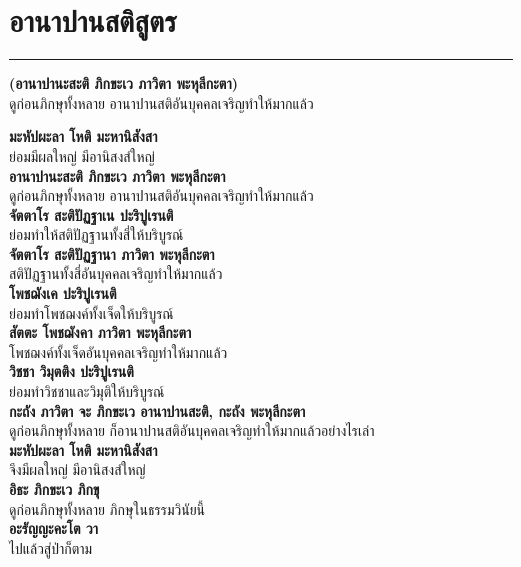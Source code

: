 \documentclass[12pt]{article}
\begin{document}
\pagebreak
\vspace*{\fill}
\begin{center}
\end{center}
\vspace{\fill}
\pagebreak

\section{อานาปานสติสูตร}
\hrule
\begin{center}
\textbf{(อานาปานะสะติ ภิกขะเว ภาวิตา พะหุลีกะตา)}\\
ดูก่อนภิกษุทั้งหลาย อานาปานสติอันบุคคลเจริญทำให้มากแล้ว
\end{center}
\textbf{มะหัปผะลา โหติ มะหานิสังสา}\\
\indent ย่อมมีผลใหญ่ มีอานิสงส์ใหญ่\\
\textbf{อานาปานะสะติ ภิกขะเว ภาวิตา พะหุลีกะตา}\\
\indent ดูก่อนภิกษุทั้งหลาย อานาปานสติอันบุคคลเจริญทำให้มากแล้ว\\
\textbf{จัตตาโร สะติปัฏฐาเน ปะริปูเรนติ}\\
\indent ย่อมทำให้สติปัฏฐานทั้งสี่ให้บริบูรณ์\\
\textbf{จัตตาโร สะติปัฏฐานา ภาวิตา พะหุลีกะตา}\\
\indent สติปัฏฐานทั้งสี่อันบุคคลเจริญทำให้มากแล้ว\\
\textbf{โพชฌังเค ปะริปูเรนติ}\\
\indent ย่อมทำโพชฌงค์ทั้งเจ็ดให้บริบูรณ์\\
\textbf{สัตตะ โพชฌังคา ภาวิตา พะหุลีกะตา}\\
\indent โพชฌงค์ทั้งเจ็ดอันบุคคลเจริญทำให้มากแล้ว\\
\textbf{วิชชา วิมุตติง ปะริปูเรนติ}\\
\indent ย่อมทำวิชชาและวิมุติให้บริบูรณ์\\
\textbf{กะถัง ภาวิตา จะ ภิกขะเว อานาปานสะติ, กะถัง พะหุลีกะตา}\\
\indent ดูก่อนภิกษุทั้งหลาย ก็อานาปานสติอันบุคคลเจริญทำให้มากแล้วอย่างไรเล่า\\
\textbf{มะหัปผะลา โหติ มะหานิสังสา}\\
\indent จึงมีผลใหญ่ มีอานิสงส์ใหญ่\\
\textbf{อิธะ ภิกขะเว ภิกขุ}\\
\indent ดูก่อนภิกษุทั้งหลาย ภิกษุในธรรมวินัยนี้\\
\textbf{อะรัญญะคะโต วา}\\
\indent ไปแล้วสู่ป่าก็ตาม\\
\end{document}
